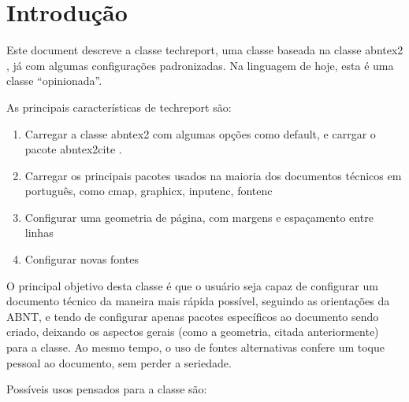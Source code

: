 \documentclass{techreport}
\renewcommand{\imprimircapa}{%
  \begin{capa}%
    
    \center
    {\ABNTEXchapterfont\Large\imprimirinstituicao}
    
    \vspace*{\fill}
    {\ABNTEXchapterfont\bfseries\LARGE\imprimirtitulo}
    \vspace*{\fill}

    \vspace*{\fill}
    {\ABNTEXchapterfont\large\imprimirautor}
    \vspace*{\fill}

    {\ABNTEXchapterfont\large\imprimirlocal}
    \par
    {\ABNTEXchapterfont\large\imprimirdata}

    \vspace*{1cm}

  \end{capa}
}
\newcommand{\trep}{\textsf{techreport}}
\begin{document}
\pretextual
\imprimircapa

%
%
\tableofcontents*

\textual


\section{Introdução}
\label{sec:introducao}

Este document descreve a classe \trep, uma classe baseada na classe \textsf{abntex2} \cite{bib:abntex2classe} , já com algumas configurações padronizadas. Na linguagem de hoje, esta é uma classe ``opinionada''.

As principais características de \trep{} são:

\begin{enumerate}
\item Carregar a classe \textsf{abntex2} com algumas opções como default, e carrgar o pacote \textsf{abntex2cite} \cite{abntex2cite}.
\item Carregar os principais pacotes usados na maioria dos documentos técnicos em português, como \textsf{cmap}, \textsf{graphicx}, \textsf{inputenc}, \textsf{fontenc}
\item Configurar uma geometria de página, com margens e espaçamento entre linhas
\item Configurar novas fontes
\end{enumerate}

O principal objetivo desta classe é que o usuário seja capaz de configurar um documento técnico da maneira mais rápida possível, seguindo as orientações da ABNT, e tendo de configurar apenas pacotes específicos ao documento sendo criado, deixando os aspectos gerais (como a geometria, citada anteriormente) para a classe. Ao mesmo tempo, o uso de fontes alternativas confere um toque pessoal ao documento, sem perder a seriedade.

Possíveis usos pensados para a classe são:
\end{document}
